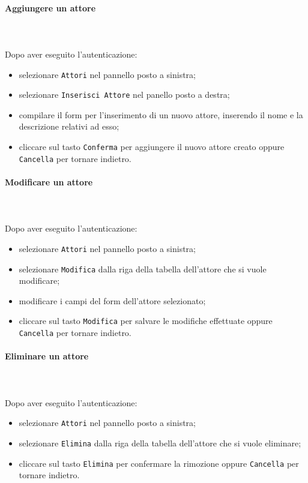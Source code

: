 \paragraph{Aggiungere un attore} \mbox{}\\ \mbox{}\\
Dopo aver eseguito l'autenticazione:
\begin{itemize}
	\item selezionare \texttt{Attori} nel pannello posto a sinistra;
	\item selezionare \texttt{Inserisci Attore} nel panello posto a destra;
	\item compilare il form per l'inserimento di un nuovo attore, inserendo 
		il nome e la descrizione relativi ad esso;
	\item cliccare sul tasto \texttt{Conferma} per aggiungere il nuovo attore 
		creato oppure \texttt{Cancella} per tornare indietro.	
\end{itemize}

\paragraph{Modificare un attore} \mbox{}\\ \mbox{}\\
Dopo aver eseguito l'autenticazione:
\begin{itemize}
	\item selezionare \texttt{Attori} nel pannello posto a sinistra;
	\item selezionare \texttt{Modifica} dalla riga della tabella dell'attore
		che si vuole modificare;
	\item modificare i campi del form dell'attore selezionato;
	\item cliccare sul tasto \texttt{Modifica} per salvare le modifiche effettuate
		oppure \texttt{Cancella} per tornare indietro.	
\end{itemize}

\paragraph{Eliminare un attore} \mbox{}\\ \mbox{}\\
Dopo aver eseguito l'autenticazione:
\begin{itemize}
	\item selezionare \texttt{Attori} nel pannello posto a sinistra;
	\item selezionare \texttt{Elimina} dalla riga della tabella dell'attore
		che si vuole eliminare;
	\item cliccare sul tasto \texttt{Elimina} per confermare la rimozione
		oppure \texttt{Cancella} per tornare indietro.	
\end{itemize}

